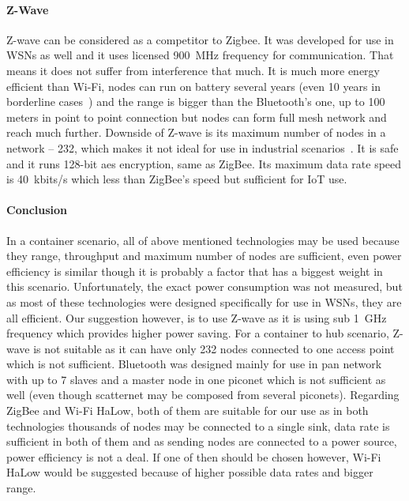 \paragraph{Z-Wave}
Z-wave can be considered as a competitor to Zigbee. It was developed for use in WSNs as well and it uses licensed 900~MHz frequency for communication. That means it does not suffer from interference that much. It is much more energy efficient than Wi-Fi, nodes can run on battery several years (even 10 years in borderline cases~\cite{PaulLamkin2018Z-WaveHome}) and the range is bigger than the Bluetooth’s one, up to 100 meters in point to point connection but nodes can form full mesh network and reach much further. Downside of Z-wave is its maximum number of nodes in a network -- 232, which makes it not ideal for use in industrial scenarios~\cite{PaulLamkin2018Z-WaveHome}. It is safe and it runs 128-bit \acrshort{aes} encryption, same as ZigBee\footnotemark. Its maximum data rate speed is 40~kbits/s which less than ZigBee’s speed but sufficient for IoT use. 
% 
\paragraph{Conclusion}
In a container scenario, all of above mentioned technologies may be used because they range, throughput and maximum number of nodes are sufficient, even power efficiency is similar though it is probably a factor that has a biggest weight in this scenario. Unfortunately, the exact power consumption was not measured, but as most of these technologies were designed specifically for use in WSNs, they are all efficient. Our suggestion however, is to use Z-wave as it is using sub 1~GHz frequency which provides higher power saving.
For a container to hub scenario, Z-wave is not suitable as it can have only 232 nodes connected to one access point which is not sufficient. Bluetooth was designed mainly for use in \acrshort{pan} network with up to 7 slaves and a master node in one piconet which is not sufficient as well (even though scatternet may be composed from several piconets). Regarding ZigBee and Wi-Fi HaLow, both of them are suitable for our use as in both technologies thousands of nodes may be connected to a single sink, data rate is sufficient in both of them and as sending nodes are connected to a power source, power efficiency is not a deal. If one of then should be chosen however, Wi-Fi HaLow would be suggested because of higher possible data rates and bigger range.

